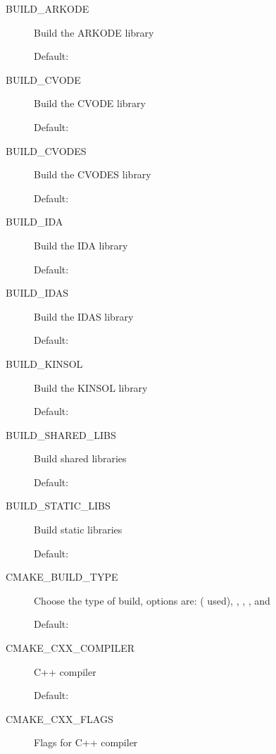 \documentclass[letterpaper,10pt,english]{sphinxmanual}
\begin{document}
\begin{description}
\item[{BUILD\_ARKODE}] \leavevmode
Build the ARKODE library

Default: 

\item[{BUILD\_CVODE}] \leavevmode
Build the CVODE library

Default: 

\item[{BUILD\_CVODES}] \leavevmode
Build the CVODES library

Default: 

\item[{BUILD\_IDA}] \leavevmode
Build the IDA library

Default: 

\item[{BUILD\_IDAS}] \leavevmode
Build the IDAS library

Default: 

\item[{BUILD\_KINSOL}] \leavevmode
Build the KINSOL library

Default: 

\item[{BUILD\_SHARED\_LIBS}] \leavevmode
Build shared libraries

Default: 

\item[{BUILD\_STATIC\_LIBS}] \leavevmode
Build static libraries

Default: 

\item[{CMAKE\_BUILD\_TYPE}] \leavevmode
Choose the type of build, options are:
 ( used), , ,
, and 

Default:

\item[{CMAKE\_CXX\_COMPILER}] \leavevmode
C++ compiler

Default: 

\item[{CMAKE\_CXX\_FLAGS}] \leavevmode
Flags for C++ compiler


\end{description}
\end{document}
